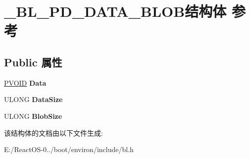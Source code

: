 \hypertarget{struct___b_l___p_d___d_a_t_a___b_l_o_b}{}\section{\+\_\+\+B\+L\+\_\+\+P\+D\+\_\+\+D\+A\+T\+A\+\_\+\+B\+L\+O\+B结构体 参考}
\label{struct___b_l___p_d___d_a_t_a___b_l_o_b}
\subsection*{Public 属性}
\begin{DoxyCompactItemize}
\item 
\mbox{\label{struct___b_l___p_d___d_a_t_a___b_l_o_b_a81a60e70965959c189e616e9d2135390}} 
\hyperlink{interfacevoid}{P\+V\+O\+ID} {\bfseries Data}
\item 
\mbox{\label{struct___b_l___p_d___d_a_t_a___b_l_o_b_a2daeda30d7d20da343dd1b14bcd78356}} 
U\+L\+O\+NG {\bfseries Data\+Size}
\item 
\mbox{\label{struct___b_l___p_d___d_a_t_a___b_l_o_b_a732b9192ab2c82d27ef66160ccd0ff35}} 
U\+L\+O\+NG {\bfseries Blob\+Size}
\end{DoxyCompactItemize}


该结构体的文档由以下文件生成\+:\begin{DoxyCompactItemize}
\item 
E\+:/\+React\+O\+S-\/0../boot/environ/include/bl.\+h\end{DoxyCompactItemize}
